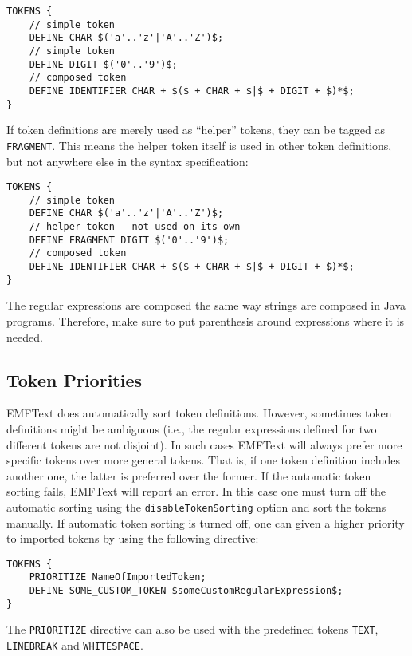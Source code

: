\begin{lstlisting}
TOKENS {
    // simple token
    DEFINE CHAR $('a'..'z'|'A'..'Z')$;
    // simple token
    DEFINE DIGIT $('0'..'9')$;
    // composed token
    DEFINE IDENTIFIER CHAR + $($ + CHAR + $|$ + DIGIT + $)*$;
}
\end{lstlisting}

If token definitions are merely used as ``helper'' tokens, they can be tagged
as \texttt{FRAGMENT}. This means the helper token itself is used in other token
definitions, but not anywhere else in the syntax specification:

\begin{lstlisting}
TOKENS {
    // simple token
    DEFINE CHAR $('a'..'z'|'A'..'Z')$;
    // helper token - not used on its own
    DEFINE FRAGMENT DIGIT $('0'..'9')$;
    // composed token
    DEFINE IDENTIFIER CHAR + $($ + CHAR + $|$ + DIGIT + $)*$;
}
\end{lstlisting}

The regular expressions are composed the same way strings are composed in Java 
programs. Therefore, make sure to put parenthesis around expressions where it
is needed.

\subsection{Token Priorities}

EMFText does automatically sort token definitions. However, sometimes 
token definitions might be ambiguous (i.e., the regular expressions defined for
two different tokens are not disjoint). In such cases EMFText will always prefer
more specific tokens over more general tokens. That is, if one token definition 
includes another one, the latter is preferred over the former. If the automatic 
token sorting fails, EMFText will report an error. In this case one must turn 
off the automatic sorting using the \texttt{disableTokenSorting} option and sort 
the tokens manually. If automatic token sorting is turned off, one can given a
higher priority to imported tokens by using the following directive:

\begin{lstlisting}
TOKENS {
	PRIORITIZE NameOfImportedToken;
	DEFINE SOME_CUSTOM_TOKEN $someCustomRegularExpression$;
}
\end{lstlisting}

The \texttt{PRIORITIZE} directive can also be used with the predefined tokens 
\texttt{TEXT}, \texttt{LINEBREAK} and \texttt{WHITESPACE}.

